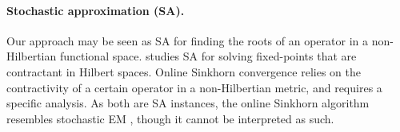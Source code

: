 \paragraph{Stochastic approximation (SA).} Our approach may be seen as SA \cite{robbins1951stochastic} for finding the roots of an
operator in a non-Hilbertian functional space. \cite{alber_stochastic_2012} studies
SA for solving fixed-points that are contractant in Hilbert spaces. Online Sinkhorn convergence relies on the contractivity of a certain operator in a non-Hilbertian metric, and requires a specific analysis. 
As both are SA instances, the online Sinkhorn algorithm resembles stochastic EM \cite{celeux_stochastic_1992}, though it cannot be interpreted as such.